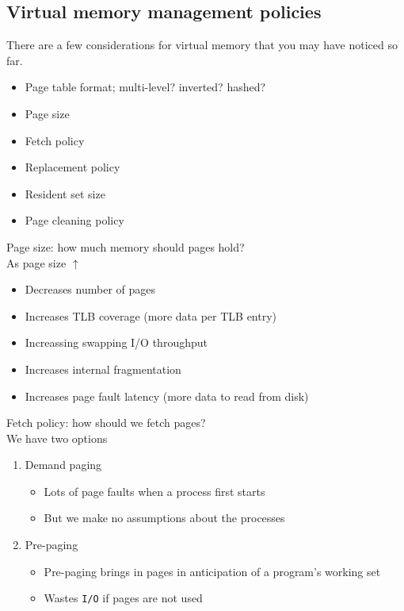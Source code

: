 \documentclass[journal, letterpaper]{IEEEtran}
\begin{document}
\subsection{Virtual memory management policies}
There are a few considerations for virtual memory that you may have noticed so far.
\begin{itemize}
    \item Page table format; multi-level? inverted? hashed?
    \item Page size
    \item Fetch policy
    \item Replacement policy
    \item Resident set size
    \item Page cleaning policy
\end{itemize}
\begin{aside}{Page size: how much memory should pages hold?} \\ 
    As page size $\uparrow$
    \begin{itemize}
        \item[\ding{51}] Decreases number of pages
        \item[\ding{51}] Increases TLB coverage (more data per TLB entry) 
        \item[\ding{51}] Increassing swapping I/O throughput
        \item[\ding{55}] Increases internal fragmentation
        \item[\ding{55}] Increases page fault latency (more data to read from disk)
    \end{itemize}
\end{aside}
\begin{aside}{Fetch policy: how should we fetch pages?} \\
    We have two options
    \begin{enumerate}
        \item Demand paging
        \begin{itemize}
            \item Lots of page faults when a process first starts
            \item But we make no assumptions about the processes
        \end{itemize}
        \item Pre-paging
        \begin{itemize}
            \item Pre-paging brings in pages in anticipation of a program's working set
            \item Wastes \verb|I/O| if pages are not used
        \end{itemize}
    \end{enumerate}
\end{aside}
\end{document}
